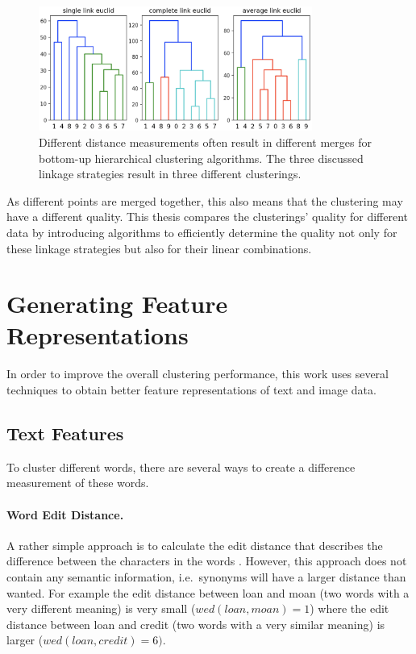 \begin{figure}[h]
    \centering
    \includegraphics[width=0.8\textwidth]{images/linkage_effects}
    \caption{Different distance measurements often result in different merges for bottom-up hierarchical clustering algorithms. The three discussed linkage strategies result in three different clusterings.}
    \label{fig:linkage_effects}
\end{figure}

As different points are merged together, this also means that the clustering may have a different quality. This thesis compares the clusterings' quality for different data by introducing algorithms to efficiently determine the quality not only for these linkage strategies but also for their linear combinations.

\section{Generating Feature Representations}

In order to improve the overall clustering performance, this work uses several techniques to obtain better feature representations of text and image data. 

\subsection{Text Features}

To cluster different words, there are several ways to create a difference measurement of these words. 

\paragraph{Word Edit Distance.} A rather simple approach is to calculate the edit distance that describes the difference between the characters in the words \cite{ristad1998learning}. However, this approach does not contain any semantic information, i.e.\ synonyms will have a larger distance than wanted. For example the edit distance between loan and moan (two words with a very different meaning) is very small ($wed(loan, moan) = 1$) where the edit distance between loan and credit (two words with a very similar meaning) is larger ($wed(loan, credit) = 6)$. 

